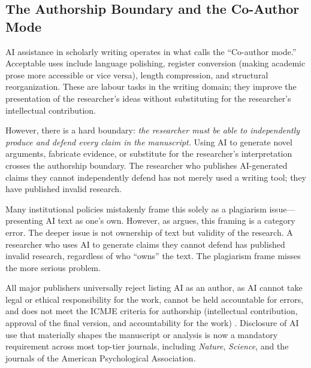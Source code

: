 \documentclass[12pt, a4paper]{article}
\begin{document}
\subsection{The Authorship Boundary and the Co-Author Mode}

AI assistance in scholarly writing operates in what \citet{zyphur2026responsible} calls the ``Co-author mode.'' Acceptable uses include language polishing, register conversion (making academic prose more accessible or vice versa), length compression, and structural reorganization. These are labour tasks in the writing domain; they improve the presentation of the researcher's ideas without substituting for the researcher's intellectual contribution.

However, there is a hard boundary: \textit{the researcher must be able to independently produce and defend every claim in the manuscript.} Using AI to generate novel arguments, fabricate evidence, or substitute for the researcher's interpretation crosses the authorship boundary. The researcher who publishes AI-generated claims they cannot independently defend has not merely used a writing tool; they have published invalid research.

Many institutional policies mistakenly frame this solely as a plagiarism issue---presenting AI text as one's own. However, as \citet{zyphur2026responsible} argues, this framing is a category error. The deeper issue is not ownership of text but validity of the research. A researcher who uses AI to generate claims they cannot defend has published invalid research, regardless of who ``owns'' the text. The plagiarism frame misses the more serious problem.

All major publishers universally reject listing AI as an author, as AI cannot take legal or ethical responsibility for the work, cannot be held accountable for errors, and does not meet the ICMJE criteria for authorship (intellectual contribution, approval of the final version, and accountability for the work) \citep{cope2023authorship, habdija2024ai}. Disclosure of AI use that materially shapes the manuscript or analysis is now a mandatory requirement across most top-tier journals, including \textit{Nature}, \textit{Science}, and the journals of the American Psychological Association.
\end{document}
